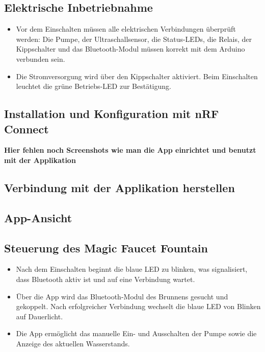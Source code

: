 \subsection{Elektrische Inbetriebnahme}
\begin{itemize}
	\item Vor dem Einschalten müssen alle elektrischen Verbindungen überprüft werden: Die Pumpe, der Ultraschallsensor, die Status-LEDs, die Relais, der Kippschalter und das Bluetooth-Modul müssen korrekt mit dem Arduino verbunden sein.
	\item Die Stromversorgung wird über den Kippschalter aktiviert. Beim Einschalten leuchtet die grüne Betriebs-LED zur Bestätigung.
\end{itemize}

\subsection{Installation und Konfiguration mit nRF Connect}
\textbf{Hier fehlen noch Screenshots wie man die App einrichtet und benutzt mit der Applikation}

\subsection*{Verbindung mit der Applikation herstellen}

\subsection*{App-Ansicht}

\subsection*{Steuerung des Magic Faucet Fountain}

\begin{itemize}
	\item Nach dem Einschalten beginnt die blaue LED zu blinken, was signalisiert, dass Bluetooth aktiv ist und auf eine Verbindung wartet.
	\item Über die App wird das Bluetooth-Modul des Brunnens gesucht und gekoppelt. Nach erfolgreicher Verbindung wechselt die blaue LED von Blinken auf Dauerlicht.
	\item Die App ermöglicht das manuelle Ein- und Ausschalten der Pumpe sowie die Anzeige des aktuellen Wasserstands.
\end{itemize}



